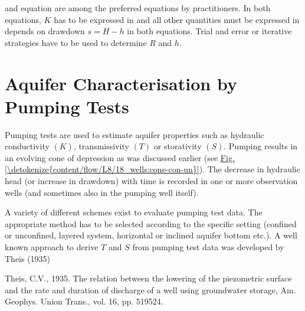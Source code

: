 \documentclass[letterpaper,10pt,english]{jupyterBook}
\begin{document}
\sphinxAtStartPar
{} and  equation are among the preferred equations by practitioners. In both equations, \(K\) has to be expressed in  and all other quantities must be expressed in   depends on drawdown \(s= H-h\) in both equations. Trial and error or iterative strategies have to be used to determine \(R\) and \(h\).


\section{Aquifer Characterisation by Pumping Tests}
\label{\detokenize{content/flow/L8/18_wells:aquifer-characterisation-by-pumping-tests}}
\sphinxAtStartPar
Pumping tests are used to estimate aquifer properties such as hydraulic conductivity \((K)\), transmissivity \((T)\) or storativity \((S)\). Pumping results in an evolving cone of depression as was discussed earlier (see \hyperref[\detokenize{content/flow/L8/18_wells:cone-con-un}]{Fig.\@ \ref{\detokenize{content/flow/L8/18_wells:cone-con-un}}}). The decrease in hydraulic head (or increase in drawdown) with time is recorded in one or more observation wells (and sometimes also in the pumping well itself).

\sphinxAtStartPar
A variety of different schemes exist to evaluate pumping test data. The appropriate method has to be selected according to the specific setting (confined or unconfined, layered system, horizontal or inclined aquifer bottom etc.). A well known approach to derive \(T\) and \(S\) from pumping test data was developed by Theis (1935)%
\begin{footnote}[2]\sphinxAtStartFootnote
Theis, C.V., 1935. The relation between the lowering of the piezometric surface and the rate and duration of discharge of a well using groundwater storage, Am. Geophys. Union Trans., vol. 16, pp. 519\sphinxhyphen{}524.
%
\end{footnote}
\end{document}
